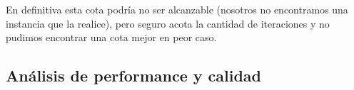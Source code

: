 
En definitiva esta cota podría no ser alcanzable (nosotros no encontramos una instancia que la realice), pero seguro acota la cantidad de iteraciones y no pudimos encontrar una cota mejor en peor caso.

\subsection{Análisis de performance y calidad}

